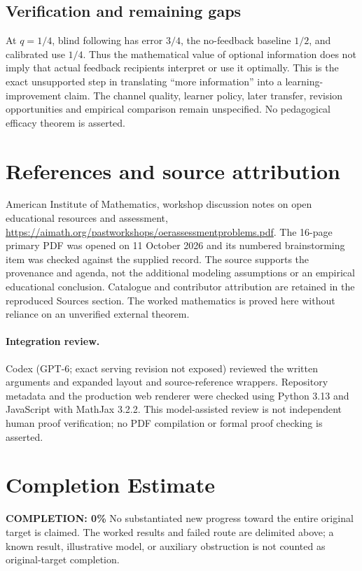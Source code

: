 \documentclass[11pt]{article}
\begin{document}
\subsection{Verification and remaining gaps}
At $q=1/4$, blind following has error $3/4$, the no-feedback baseline $1/2$, and calibrated use $1/4$. Thus the mathematical value of optional information does not imply that actual feedback recipients interpret or use it optimally. This is the exact unsupported step in translating ``more information'' into a learning-improvement claim. The channel quality, learner policy, later transfer, revision opportunities and empirical comparison remain unspecified. No pedagogical efficacy theorem is asserted.

\section{References and source attribution}
American Institute of Mathematics, workshop discussion notes on open educational resources and assessment, \url{https://aimath.org/pastworkshops/oerassessmentproblems.pdf}. The 16-page primary PDF was opened on 11 October 2026 and its numbered brainstorming item was checked against the supplied record. The source supports the provenance and agenda, not the additional modeling assumptions or an empirical educational conclusion. Catalogue and contributor attribution are retained in the reproduced Sources section. The worked mathematics is proved here without reliance on an unverified external theorem.


\paragraph{Integration review.} Codex (GPT-6; exact serving revision not exposed) reviewed the written arguments and expanded layout and source-reference wrappers. Repository metadata and the production web renderer were checked using Python 3.13 and JavaScript with MathJax 3.2.2. This model-assisted review is not independent human proof verification; no PDF compilation or formal proof checking is asserted.

\section{Completion Estimate}
\noindent\textbf{COMPLETION: 0\%}
No substantiated new progress toward the entire original target is claimed. The worked results and failed route are delimited above; a known result, illustrative model, or auxiliary obstruction is not counted as original-target completion.
\end{document}
